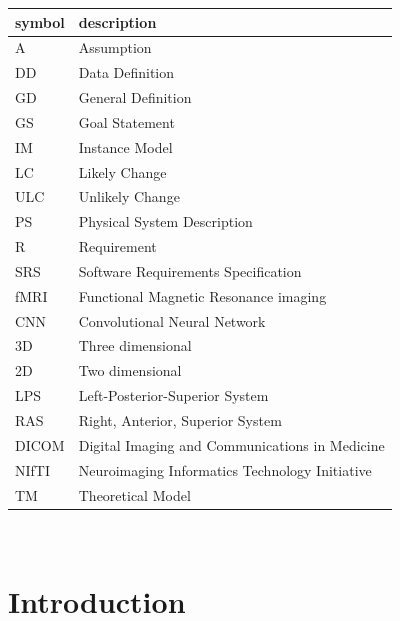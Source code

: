 \documentclass[12pt]{article}
\begin{document}
\renewcommand{\arraystretch}{1.2}
\begin{tabular}{l l}
  \toprule
  \textbf{symbol} & \textbf{description}                           \\
  \midrule
  A               & Assumption                                     \\
  DD              & Data Definition                                \\
  GD              & General Definition                             \\
  GS              & Goal Statement                                 \\
  IM              & Instance Model                                 \\
  LC              & Likely Change                                  \\
  ULC             & Unlikely Change                                \\
  PS              & Physical System Description                    \\
  R               & Requirement                                    \\
  SRS             & Software Requirements Specification            \\
  fMRI            & Functional Magnetic Resonance imaging          \\
  CNN             & Convolutional Neural Network                   \\
  3D              & Three dimensional                              \\
  2D              & Two dimensional                                \\
  LPS             & Left-Posterior-Superior System                 \\
  RAS             & Right, Anterior, Superior System               \\
  DICOM           & Digital Imaging and Communications in Medicine \\
  NIfTI           & Neuroimaging Informatics Technology Initiative \\
  TM              & Theoretical Model                              \\
  \bottomrule
\end{tabular}\\


\newpage



\section{Introduction}
\end{document}
